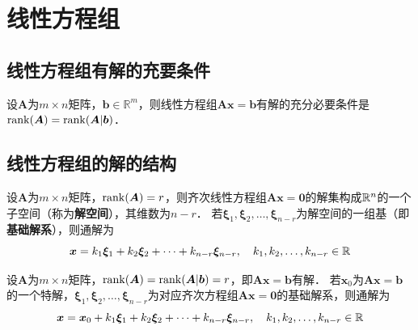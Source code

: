\documentclass[12pt, a4paper, oneside, UTF8]{ctexbook}
\begin{document}
% 
\else
\fi
\chapter{线性方程组}

\section{线性方程组有解的充要条件}
\begin{theorem}
    设$\bm{A}$为$m\times n$矩阵，$\bm{b}\in \mathbb{R}^m$，则线性方程组$\bm{Ax}=\bm{b}$有解的充分必要条件是$\mathrm{rank}(\bm{A}) = \mathrm{rank}(\bm{A}|\bm{b})$．
\end{theorem}
\section{线性方程组的解的结构}
\begin{theorem}[齐次线性方程组解的结构]
    设$\bm{A}$为$m\times n$矩阵，$\mathrm{rank}(\bm{A}) = r$，则齐次线性方程组$\bm{Ax}=\bm{0}$的解集构成$\mathbb{R}^n$的一个子空间（称为\textbf{解空间}），其维数为$n-r$．
    若$\bm{\xi}_1,\bm{\xi}_2,\ldots,\bm{\xi}_{n-r}$为解空间的一组基（即\textbf{基础解系}），则通解为
    \[
        \bm{x} = k_1\bm{\xi}_1 + k_2\bm{\xi}_2 + \cdots + k_{n-r}\bm{\xi}_{n-r},\quad k_1,k_2,\ldots,k_{n-r}\in\mathbb{R}
    \]
\end{theorem}

\begin{theorem}[非齐次线性方程组解的结构]
    设$\bm{A}$为$m\times n$矩阵，$\mathrm{rank}(\bm{A}) = \mathrm{rank}(\bm{A}|\bm{b}) = r$，即$\bm{Ax}=\bm{b}$有解．
    若$\bm{x}_0$为$\bm{Ax}=\bm{b}$的一个特解，$\bm{\xi}_1,\bm{\xi}_2,\ldots,\bm{\xi}_{n-r}$为对应齐次方程组$\bm{Ax}=\bm{0}$的基础解系，则通解为
    \[
        \bm{x} = \bm{x}_0 + k_1\bm{\xi}_1 + k_2\bm{\xi}_2 + \cdots + k_{n-r}\bm{\xi}_{n-r},\quad k_1,k_2,\ldots,k_{n-r}\in\mathbb{R}
    \]
\end{theorem}
\end{document}
